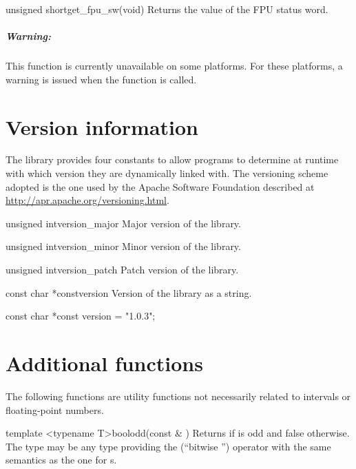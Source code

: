 \documentclass{manual}
\begin{document}
\begin{deffun}{unsigned short}{get\_fpu\_sw}{(void)}
Returns the value of the FPU status word.

\paragraph{Warning:} This function is currently unavailable on some platforms.
For these platforms, a warning is issued when the function is called.
\end{deffun}

\chapter{Version information}

The library provides four constants to allow programs to determine at runtime with which version
they are dynamically linked with. The versioning scheme adopted is the one used by the Apache
Software Foundation described at \url{http://apr.apache.org/versioning.html}.

\begin{defconst}{unsigned int}{version\_major}
  Major version of the library.
\end{defconst}

\begin{defconst}{unsigned int}{version\_minor}
  Minor version of the library.
\end{defconst}

\begin{defconst}{unsigned int}{version\_patch}
  Patch version of the library.
\end{defconst}

\begin{defconst}{const char *const}{version}
  Version of the library as a string.
\begin{example}
 const char *const version = "1.0.3";
\end{example}
\end{defconst}

\chapter{Additional functions}

The following functions are utility functions not necessarily related to
intervals or floating-point numbers.

\begin{defTfun}{template <typename T>}{bool}{odd}{(const \& )}
  Returns  if  is odd and false otherwise. The 
  type may be any type providing the \code{\&} (``bitwise '') operator
  with the same semantics as the one for s.
\end{defTfun}
\end{document}
